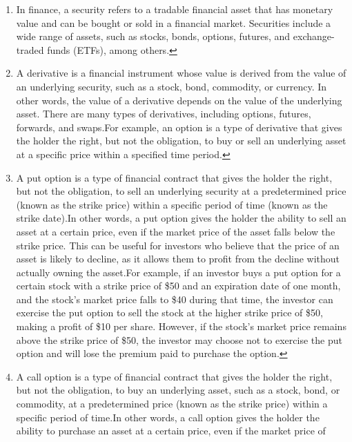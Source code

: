 \documentclass[
]{book}
\begin{document}
\begin{enumerate}
\def\labelenumi{\arabic{enumi}.}
\item
  In finance, a security refers to a tradable financial asset that has monetary
  value and can be bought or sold in a financial market. Securities include a wide
  range of assets, such as stocks, bonds, options, futures, and exchange-traded
  funds (ETFs), among others.\protect\hyperlink{intro}{↩︎}
\item
  A derivative is a financial instrument whose value is derived from the value
  of an underlying security, such as a stock, bond, commodity, or currency.
  In other words, the value of a derivative depends on the value of the underlying
  asset. There are many types of derivatives, including options, futures,
  forwards, and swaps.For example, an option is a type of derivative that
  gives the holder the right, but not the obligation, to buy or sell an underlying
  asset at a specific price within a specified time period.\protect\hyperlink{intro}{↩︎}
\item
  A put option is a type of financial contract that gives the holder the right,
  but not the obligation, to sell an underlying security at a predetermined price
  (known as the strike price) within a specific period of time (known as the
  strike date).In other words, a put option gives the holder the ability
  to sell an asset at a certain price, even if the market price of the asset falls
  below the strike price. This can be useful for investors who believe that the
  price of an asset is likely to decline, as it allows them to profit from the
  decline without actually owning the asset.For example, if an investor
  buys a put option for a certain stock with a strike price of \$50 and an
  expiration date of one month, and the stock's market price falls to \$40 during
  that time, the investor can exercise the put option to sell the stock at the
  higher strike price of \$50, making a profit of \$10 per share. However, if the
  stock's market price remains above the strike price of \$50, the investor may
  choose not to exercise the put option and will lose the premium paid to purchase
  the option.\protect\hyperlink{intro}{↩︎}
\item
  A call option is a type of financial contract that gives the holder the
  right, but not the obligation, to buy an underlying asset, such as a stock,
  bond, or commodity, at a predetermined price (known as the strike price) within
  a specific period of time.In other words, a call option gives the holder
  the ability to purchase an asset at a certain price, even if the market price of

\end{enumerate}
\end{document}
